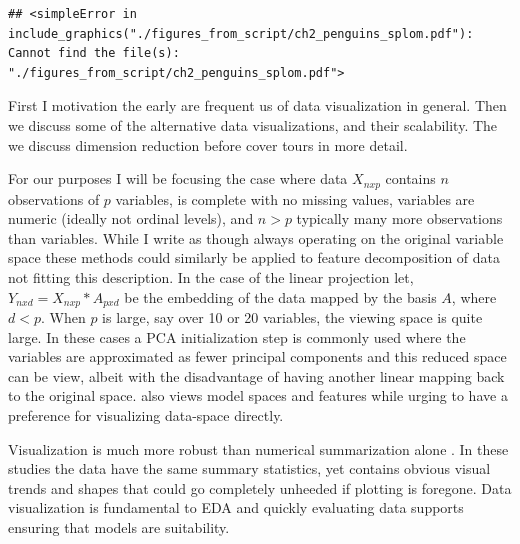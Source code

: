 \documentclass{template/monashthesis}
\begin{document}
\begin{Shaded}
\begin{Highlighting}[]
\NormalTok{(}\NormalTok{(}\NormalTok{), }
\end{Highlighting}
\end{Shaded}

\begin{verbatim}
## <simpleError in include_graphics("./figures_from_script/ch2_penguins_splom.pdf"): Cannot find the file(s): "./figures_from_script/ch2_penguins_splom.pdf">
\end{verbatim}

First I motivation the early are frequent us of data visualization in general. Then we discuss some of the alternative data visualizations, and their scalability. The we discuss dimension reduction before cover tours in more detail.

For our purposes I will be focusing the case where data \(X_{nxp}\) contains \(n\) observations of \(p\) variables, is complete with no missing values, variables are numeric (ideally not ordinal levels), and \(n>p\) typically many more observations than variables. While I write as though always operating on the original variable space these methods could similarly be applied to feature decomposition of data not fitting this description. In the case of the linear projection let, \(Y_{nxd} = X_{nxp} * A_{pxd}\) be the embedding of the data mapped by the basis \(A\), where \(d<p\). When \(p\) is large, say over 10 or 20 variables, the viewing space is quite large. In these cases a PCA initialization step is commonly used where the variables are approximated as fewer principal components and this reduced space can be view, albeit with the disadvantage of having another linear mapping back to the original space. \textcite{wickham_visualizing_2015} also views model spaces and features while urging to have a preference for visualizing data-space directly.

Visualization is much more robust than numerical summarization alone \autocite{anscombe_graphs_1973,matejka_same_2017}. In these studies the data have the same summary statistics, yet contains obvious visual trends and shapes that could go completely unheeded if plotting is foregone. Data visualization is fundamental to EDA and quickly evaluating data supports ensuring that models are suitability.
\end{document}
